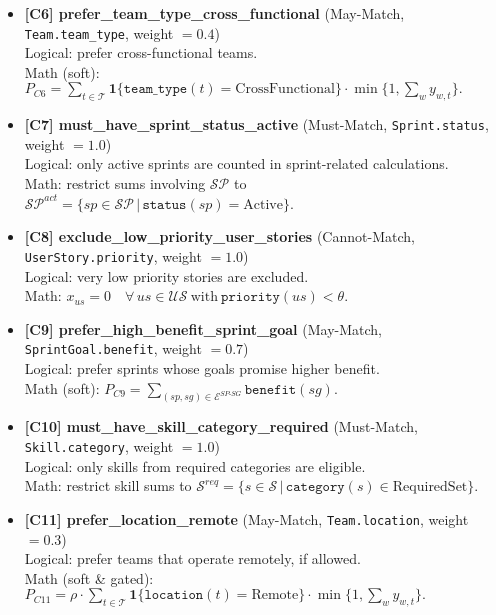 \documentclass[11pt,a4paper]{article}
\begin{document}
\begin{itemize}[leftmargin=*]
  \item \textbf{[C6] prefer\_team\_type\_cross\_functional} (May-Match, \texttt{Team.team\_type}, weight $=0.4$)\\
  Logical: prefer cross-functional teams.\\
  Math (soft): $P_{C6}=\sum_{t\in\mathcal{T}} \mathbf{1}\{\texttt{team\_type}(t)=\text{CrossFunctional}\}\cdot \min\{1,\sum_{w} y_{w,t}\}.$

  \item \textbf{[C7] must\_have\_sprint\_status\_active} (Must-Match, \texttt{Sprint.status}, weight $=1.0$)\\
  Logical: only active sprints are counted in sprint-related calculations.\\
  Math: restrict sums involving $\mathcal{SP}$ to $\mathcal{SP}^{act}=\{sp\in\mathcal{SP}\,|\,\texttt{status}(sp)=\text{Active}\}$.

  \item \textbf{[C8] exclude\_low\_priority\_user\_stories} (Cannot-Match, \texttt{UserStory.priority}, weight $=1.0$)\\
  Logical: very low priority stories are excluded.\\
  Math: $x_{us}=0\quad \forall\, us\in\mathcal{US}\ \text{with}\ \texttt{priority}(us)<\theta.$

  \item \textbf{[C9] prefer\_high\_benefit\_sprint\_goal} (May-Match, \texttt{SprintGoal.benefit}, weight $=0.7$)\\
  Logical: prefer sprints whose goals promise higher benefit.\\
  Math (soft): $P_{C9}=\sum_{(sp,sg)\in\mathcal{E}^{SP\text{-}SG}} \texttt{benefit}(sg).$

  \item \textbf{[C10] must\_have\_skill\_category\_required} (Must-Match, \texttt{Skill.category}, weight $=1.0$)\\
  Logical: only skills from required categories are eligible.\\
  Math: restrict skill sums to $\mathcal{S}^{req}=\{s\in\mathcal{S}\,|\, \texttt{category}(s)\in \text{RequiredSet}\}$.

  \item \textbf{[C11] prefer\_location\_remote} (May-Match, \texttt{Team.location}, weight $=0.3$)\\
  Logical: prefer teams that operate remotely, if allowed.\\
  Math (soft \& gated): $P_{C11}=\rho \cdot \sum_{t\in\mathcal{T}} \mathbf{1}\{\texttt{location}(t)=\text{Remote}\}\cdot \min\{1,\sum_{w} y_{w,t}\}.$
\end{itemize}
\end{document}
